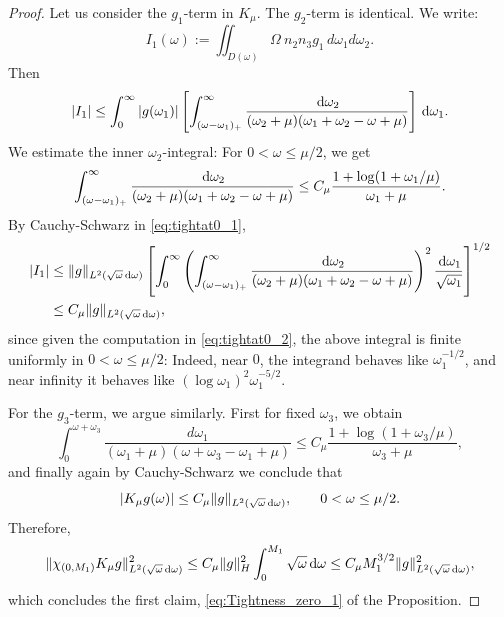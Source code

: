 \documentclass[reqno,11pt,letterpaper]{amsart}
\numberwithin{equation}{section}
\newcommand{\dd}{\, {\rm d}}
\begin{document}
\begin{proof}
    Let us consider the $g_1$-term in $K_\mu$. The $g_2$-term is identical. We write:  
    $$I_1(\omega):= \iint_{D(\omega)} \Omega\  n_2n_3g_1\,d\omega_1d\omega_2.$$
    Then 
    \begin{align} \label{eq:tightat0_1}
        |I_1|\leq \int_0^\infty |g(\omega_1)|\left[ \int_{(\omega-\omega_1)_+}^\infty \frac{\dd \omega_2}{(\omega_2+\mu)(\omega_1+\omega_2-\omega + \mu)} \right] \dd \omega_1.
    \end{align}
    We estimate the inner $\omega_2$-integral: For $0<\omega\le\mu/2$, we get
\begin{align}\label{eq:tightat0_2}\int_{(\omega-\omega_1)_+}^\infty \frac{\dd \omega_2}{(\omega_2+\mu)(\omega_1+\omega_2-\omega + \mu)}
    \le C_\mu
    \frac{1+\log(1+\omega_1/\mu)}{\omega_1+\mu}.
\end{align}
By Cauchy-Schwarz in \eqref{eq:tightat0_1}, 
\begin{equation}\label{eq:tightat0_3}
\begin{split}
     |I_1| 
    &\leq \|g\|_{L^2(\sqrt{\omega}\dd\omega)} \left[ \int_0^\infty \left( \int_{(\omega-\omega_1)_+}^\infty \frac{\dd \omega_2}{(\omega_2+\mu)(\omega_1+\omega_2-\omega + \mu)}\right)^2 \frac{\dd\omega_1}{\sqrt{\omega_1}}\right]^{1/2}
    \\
    & \leq C_\mu \|g\|_{L^2(\sqrt{\omega}\dd\omega)}, 
\end{split}
\end{equation}
since given the computation in \eqref{eq:tightat0_2}, the above integral is finite uniformly in $0<\omega\le\mu/2$: Indeed, near $0$, the integrand behaves like $\omega_1^{-1/2}$, and near infinity it behaves like $(\log \omega_1)^2\omega_1^{-5/2}$. 

For the $g_3$-term, we argue similarly. First for fixed $\omega_3$, we obtain
$$\int_0^{\omega+\omega_3}
    \frac{d\omega_1}
    {(\omega_1+\mu)(\omega+\omega_3-\omega_1+\mu)}
    \le C_\mu
    \frac{1+\log(1+\omega_3/\mu)}{\omega_3+\mu}, 
$$ 
and finally again by Cauchy-Schwarz we conclude that 
$$ |K_\mu g(\omega)|
    \le C_\mu\|g\|_{L^2(\sqrt{\omega}\dd\omega)},
    \qquad 0<\omega\le\mu/2.
$$
Therefore, 
\begin{equation}
    \|\chi_{(0,M_1)}K_\mu g\|_{L^2(\sqrt{\omega}\dd\omega)}^2
    \le
    C_\mu\|g\|_H^2
    \int_0^{M_1}\sqrt{\omega} \dd\omega \le
    C_\mu M_1^{3/2}\|g\|_{L^2(\sqrt{\omega}\dd\omega)}^2, 
\end{equation}
which concludes the first claim, \eqref{eq:Tightness_zero_1} of the Proposition.


\end{proof}
\end{document}
